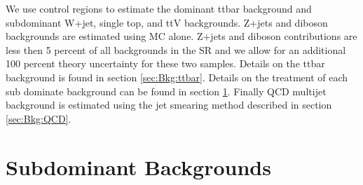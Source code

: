 \indent We use control regions to estimate the dominant ttbar background and subdominant W+jet, single top, and ttV backgrounds.  Z+jets and diboson backgrounds are estimated using MC alone.  Z+jets and diboson contributions are less then 5 percent of all backgrounds in the SR and we allow for an additional 100 percent theory uncertainty for these two samples.  Details on the ttbar background is found in section \ref{sec:Bkg:ttbar}. Details on the treatment of each sub dominate background can be found in section \ref{sec:Bkg:sub}. Finally QCD multijet background is estimated using the jet smearing method described in section \ref{sec:Bkg:QCD}. \\



\section{Subdominant Backgrounds}
\label{sec:Bkg:sub}






